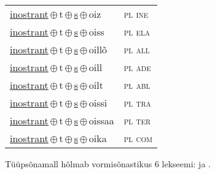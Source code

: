\begin{minipage}{\textwidth}
\begin{sideways}
\begin{tabular}{l l}
\underline{inostrant}\,$\oplus$\,t\,$\oplus$\,\underline{s}\,$\oplus$\,oiz & \textsc{ pl ine } \\
\underline{inostrant}\,$\oplus$\,t\,$\oplus$\,\underline{s}\,$\oplus$\,oiss & \textsc{ pl ela } \\
\underline{inostrant}\,$\oplus$\,t\,$\oplus$\,\underline{s}\,$\oplus$\,oillõ & \textsc{ pl all } \\
\underline{inostrant}\,$\oplus$\,t\,$\oplus$\,\underline{s}\,$\oplus$\,oill & \textsc{ pl ade } \\
\underline{inostrant}\,$\oplus$\,t\,$\oplus$\,\underline{s}\,$\oplus$\,oilt & \textsc{ pl abl } \\
\underline{inostrant}\,$\oplus$\,t\,$\oplus$\,\underline{s}\,$\oplus$\,oissi & \textsc{ pl tra } \\
\underline{inostrant}\,$\oplus$\,t\,$\oplus$\,\underline{s}\,$\oplus$\,oissaa & \textsc{ pl ter } \\
\underline{inostrant}\,$\oplus$\,t\,$\oplus$\,\underline{s}\,$\oplus$\,oika & \textsc{ pl com } \\
\end{tabular}
\end{sideways}
\label{tab:tüüpsõnamall-inostranttsõ}

\end{minipage}

 
\vspace{1em}
\noindent Tüüpsõnamall  hõlmab vormisõnastikus 6 lekseemi:  ja .

